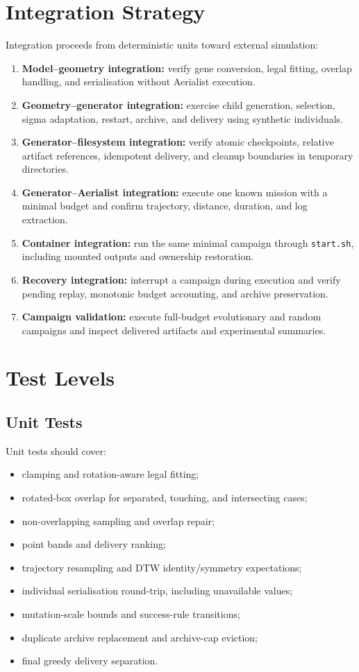 \documentclass[11pt,a4paper]{report}
\newcommand{\code}[1]{\texttt{#1}}
\begin{document}
\section{Integration Strategy}
Integration proceeds from deterministic units toward external simulation:
\begin{enumerate}
  \item \textbf{Model--geometry integration:} verify gene conversion, legal fitting, overlap handling, and serialisation without Aerialist execution.
  \item \textbf{Geometry--generator integration:} exercise child generation, selection, sigma adaptation, restart, archive, and delivery using synthetic individuals.
  \item \textbf{Generator--filesystem integration:} verify atomic checkpoints, relative artifact references, idempotent delivery, and cleanup boundaries in temporary directories.
  \item \textbf{Generator--Aerialist integration:} execute one known mission with a minimal budget and confirm trajectory, distance, duration, and log extraction.
  \item \textbf{Container integration:} run the same minimal campaign through \code{start.sh}, including mounted outputs and ownership restoration.
  \item \textbf{Recovery integration:} interrupt a campaign during execution and verify pending replay, monotonic budget accounting, and archive preservation.
  \item \textbf{Campaign validation:} execute full-budget evolutionary and random campaigns and inspect delivered artifacts and experimental summaries.
\end{enumerate}

\section{Test Levels}

\subsection{Unit Tests}
Unit tests should cover:
\begin{itemize}
  \item clamping and rotation-aware legal fitting;
  \item rotated-box overlap for separated, touching, and intersecting cases;
  \item non-overlapping sampling and overlap repair;
  \item point bands and delivery ranking;
  \item trajectory resampling and DTW identity/symmetry expectations;
  \item individual serialisation round-trip, including unavailable values;
  \item mutation-scale bounds and success-rule transitions;
  \item duplicate archive replacement and archive-cap eviction;
  \item final greedy delivery separation.
\end{itemize}
\end{document}
